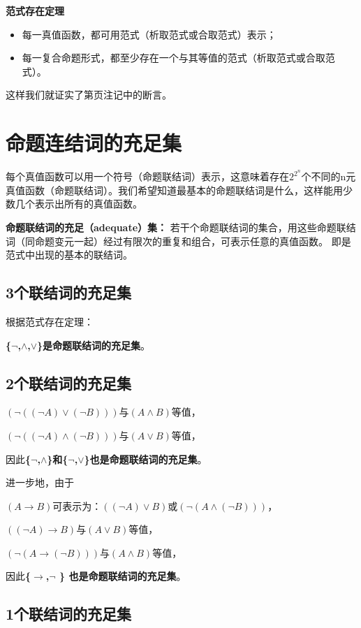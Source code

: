 \documentclass[12pt,onecolumn,a4paper]{book}
\numberwithin{table}{subsection}
\numberwithin{equation}{subsection}
\begin{document}
\textbf{范式存在定理}
\begin{itemize}[itemsep=0pt,parsep=0pt]
    \item 每一真值函数，都可用范式（析取范式或合取范式）表示；
    \item 每一复合命题形式，都至少存在一个与其等值的范式（析取范式或合取范式）。
\end{itemize}

这样我们就证实了第\pageref{compose}页注记中的断言。

\section{命题连结词的充足集}

每个真值函数可以用一个符号（命题联结词）表示，这意味着存在$ 2^{2^n} $个不同的n元真值函数（命题联结词）。我们希望知道最基本的命题联结词是什么，这样能用少数几个表示出所有的真值函数。

\textbf{命题联结词的充足（adequate）集：}
若干个命题联结词的集合，用这些命题联结词（同命题变元一起）经过有限次的重复和组合，可表示任意的真值函数。
即是范式中出现的基本的联结词。

\subsection{3个联结词的充足集}
根据范式存在定理：

\textbf{\{$\neg$,$\wedge$,$\vee$\}是命题联结词的充足集}。

\subsection{2个联结词的充足集}

$(\neg ((\neg A)\vee(\neg B)))$与$(A\wedge B)$等值，

$(\neg ((\neg A)\wedge (\neg B)))$与$(A\vee B)$等值，

因此\textbf{\{$\neg$,$\wedge$\}和\{$\neg$,$\vee$\}也是命题联结词的充足集}。

进一步地，由于

$(A \rightarrow B )$可表示为：$((\neg A)\vee B)$或$(\neg (A \wedge (\neg B)))$，

$((\neg A)\rightarrow B)$与$(A\vee B)$等值，

$(\neg(A\rightarrow(\neg B)))$与$(A\wedge B)$等值，

因此\textbf{\{$ \rightarrow$,$\neg$ \} 也是命题联结词的充足集}。

\subsection{1个联结词的充足集}
\end{document}
